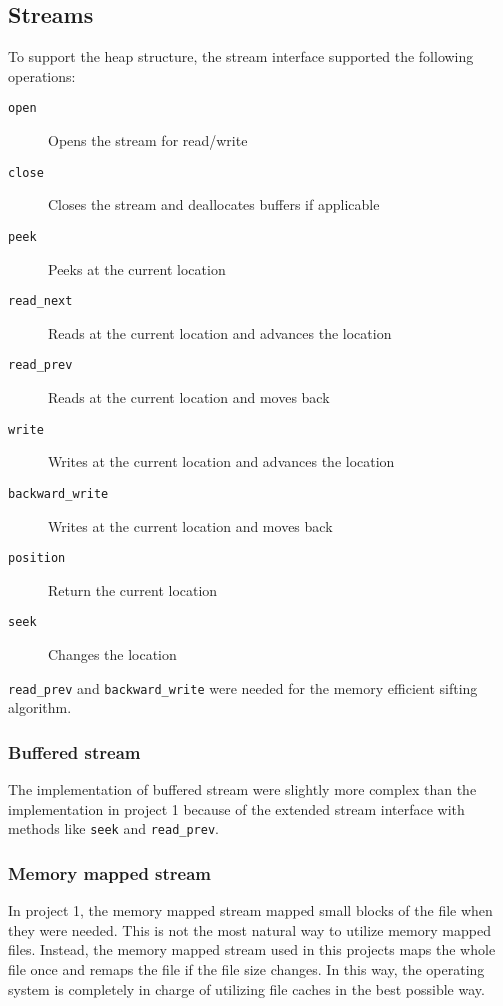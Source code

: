 \documentclass[a4paper,12pt]{article}
\begin{document}
\subsection{Streams}

To support the heap structure, the stream interface supported the following operations:

\begin{description}
\item[{\texttt{open}}] Opens the stream for read/write
\item[{\texttt{close}}] Closes the stream and deallocates buffers if applicable
\item[{\texttt{peek}}] Peeks at the current location
\item[{\texttt{read\_next}}] Reads at the current location and advances the location
\item[{\texttt{read\_prev}}] Reads at the current location and moves back
\item[{\texttt{write}}] Writes at the current location and advances the location
\item[{\texttt{backward\_write}}] Writes at the current location and moves back
\item[{\texttt{position}}] Return the current location
\item[{\texttt{seek}}] Changes the location
\end{description}

\texttt{read\_prev} and \texttt{backward\_write} were needed for the memory efficient sifting algorithm.

\subsubsection{Buffered stream}

The implementation of buffered stream were slightly more complex than the implementation in project 1 because of the extended stream interface with methods like \texttt{seek} and \texttt{read\_prev}.


\subsubsection{Memory mapped stream}

In project 1, the memory mapped stream mapped small blocks of the file when they were needed. This is not the most natural way to utilize memory mapped files. Instead, the memory mapped stream used in this projects maps the whole file once and remaps the file if the file size changes. In this way, the operating system is completely in charge of utilizing file caches in the best possible way.
\end{document}
